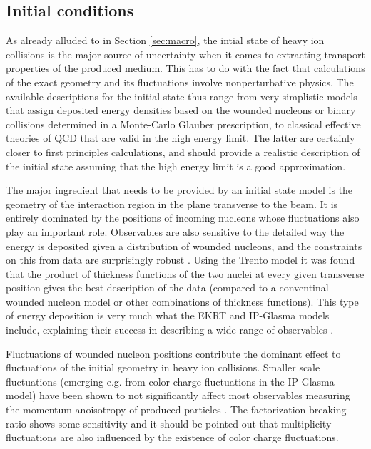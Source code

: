 \subsection{Initial conditions} \label{sec:initialstate}
As already alluded to in Section \ref{sec:macro}, the intial state of heavy ion collisions is the major source of uncertainty when it comes to extracting transport properties of the produced medium. This has to do with the fact that calculations of the exact geometry and its fluctuations involve nonperturbative physics. The available descriptions for the initial state thus range from very simplistic models that assign deposited energy densities based on the wounded nucleons or binary collisions determined in a Monte-Carlo Glauber prescription, to classical effective theories of QCD that are valid in the high energy limit. The latter are certainly closer to first principles calculations, and should provide a realistic description of the initial state assuming that the high energy limit is a good approximation.

The major ingredient that needs to be provided by an initial state model is the geometry of the interaction region in the plane transverse to the beam. It is entirely dominated by the positions of incoming nucleons whose fluctuations also play an important role. Observables are also sensitive to the detailed way the energy is deposited given a distribution of wounded nucleons, and the constraints on this from data are surprisingly robust \cite{Moreland:2018gsh}. Using the Trento model it was found that the product of thickness functions of the two nuclei at every given transverse position gives the best description of the data (compared to a conventinal wounded nucleon model or other combinations of thickness functions). This type of energy deposition is very much what the EKRT \cite{Niemi:2015qia} and IP-Glasma \cite{Schenke:2012wb,Schenke:2012fw} models include, explaining their success in describing a wide range of observables \cite{Niemi:2015qia,Gale:2012rq}.

Fluctuations of wounded nucleon positions contribute the dominant effect to fluctuations of the initial geometry in heavy ion collisions. Smaller scale fluctuations (emerging e.g. from color charge fluctuations in the IP-Glasma model) have been shown to not significantly affect most observables measuring the momentum anoisotropy of produced particles \cite{Gardim:2017ruc}. The factorization breaking ratio shows some sensitivity and it should be pointed out that multiplicity fluctuations are also influenced by the existence of color charge fluctuations.

